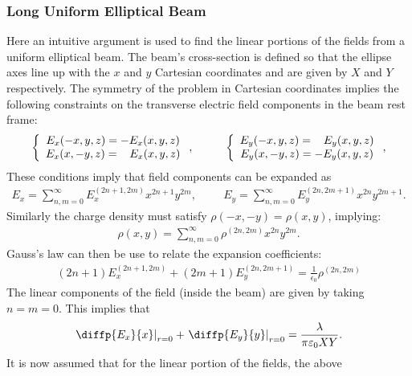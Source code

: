 \subsubsection{Long Uniform Elliptical Beam}

Here an intuitive argument is used to find the linear portions of the fields
from a uniform elliptical beam. The beam's cross-section is defined so that the
ellipse axes line up with the $x$ and $y$ Cartesian coordinates and are given by
$X$ and $Y$ respectively. The symmetry of the problem in Cartesian coordinates
implies the following constraints on the transverse electric field components in
the beam rest frame:
%
\begin{eqnarray}
\left\{
\begin{array}{c}
E_x(-x,y,z) = -E_x(x,y,z) \\
E_x(x,-y,z) = \hspace{0.3cm}E_x(x,y,z)
\end{array}
\right. ,
\hspace{1cm}
\left\{
\begin{array}{c}
E_y(-x,y,z) = \hspace{0.3cm}E_y(x,y,z) \\
E_y(x,-y,z) = -E_y(x,y,z)\end{array}
\right. ,
\end{eqnarray}
%
These conditions imply that field components can be expanded as
%
\begin{eqnarray}
E_x = \sum_{n,m=0}^{\infty}E_x^{(2n+1,2m)}x^{2n+1}y^{2m},\hspace{1cm}E_y = \sum_{n,m=0}^{\infty}E_y^{(2n,2m+1)}x^{2n}y^{2m+1}.
\end{eqnarray}
%
Similarly the charge density must satisfy $\rho(-x,-y) = \rho(x,y)$, implying:
%
\begin{eqnarray}
\rho(x,y) = \sum_{n,m=0}^{\infty}\rho^{(2n,2m)}x^{2n}y^{2m}.
\end{eqnarray}
%
Gauss's law can then be use to relate the expansion coefficients:
%
\begin{eqnarray}
(2n+1)E_x^{(2n+1,2m)} + (2m+1)E_y^{(2n, 2m+1)} = \frac{1}{\epsilon_0}\rho^{(2n,2m)}
\end{eqnarray}
%
The linear components of the field (inside the beam) are given by taking
$n=m=0$. This implies that
%
\begin{eqnarray}
\left.\diffp{E_x}{x}\right|_{r=0} + \left.\diffp{E_y}{y}\right|_{r=0} = \frac{\lambda}{\pi\epsilon_0XY}.
\end{eqnarray}
%
It is now assumed that for the linear portion of the fields, the above
